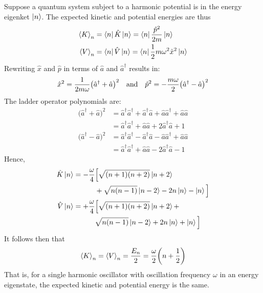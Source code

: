 \documentclass[nofootinbib,reprint,english]{revtex4-1}
\begin{document}
Suppose a quantum system subject to a harmonic potential is in the energy eigenket \(\ket{n}\). The expected kinetic and potential energies are thus
\begin{subequations}
\begin{align}
\expval{K}_n&=\bra{n}\hat{K}\ket{n}=\bra{n}\frac{\hat{p}^2}{2m}\ket{n}\\
\expval{V}_n&=\bra{n}\hat{V}\ket{n}=\bra{n}\frac{1}{2}m\omega^2\hat{x}^2\ket{n}
\end{align}
\end{subequations}
Rewriting \(\hat{x}\) and \(\hat{p}\) in terms of \(\hat{a}\) and \(\hat{a}^\dagger\) results in:
\begin{align*}
\hat{x}^2=\frac{1}{2m\omega}\big(\hat{a}^\dagger+\hat{a}\big)^2\qand\hat{p}^2=-\frac{m\omega}{2}\big(\hat{a}^\dagger-\hat{a}\big)^2
\end{align*}
The ladder operator polynomials are:
\begin{align*}
\big(\hat{a}^\dagger+\hat{a}\big)^2&=\hat{a}^\dagger\hat{a}^\dagger+\hat{a}^\dagger\hat{a}+\hat{a}\hat{a}^\dagger+\hat{a}\hat{a}\\
&=\hat{a}^\dagger\hat{a}^\dagger+\hat{a}\hat{a}+2\hat{a}^\dagger\hat{a}+1\\[0.25cm]
\big(\hat{a}^\dagger-\hat{a}\big)^2&=\hat{a}^\dagger\hat{a}^\dagger-\hat{a}^\dagger\hat{a}-\hat{a}\hat{a}^\dagger+\hat{a}\hat{a}\\
&=\hat{a}^\dagger\hat{a}^\dagger+\hat{a}\hat{a}-2\hat{a}^\dagger\hat{a}-1
\end{align*}
Hence,
\begin{subequations}\label{eq:harmonic_oscillator_kinetic_and_potential_action}
\begin{align}
\hat{K}\ket{n}&=-\frac{\omega}{4}\Big[\sqrt{(n+1)(n+2)}\ket{n+2}\nonumber\\
&\qquad\quad+\sqrt{n(n-1)}\ket{n-2}-2n\ket{n}-\ket{n}\Big]\\
\hat{V}\ket{n}&=+\frac{\omega}{4}\Big[\sqrt{(n+1)(n+2)}\ket{n+2}+\nonumber\\
&\qquad\quad\sqrt{n(n-1)}\ket{n-2}+2n\ket{n}+\ket{n}\Big]
\end{align}
\end{subequations}
It follows then that
\begin{equation}
\expval{K}_n=\expval{V}_n=\frac{E_n}{2}=\frac{\omega}{2}\bigg(n+\frac{1}{2}\bigg)
\end{equation}
That is, for a single harmonic oscillator with oscillation frequency \(\omega\) in an energy eigenstate, the expected kinetic and potential energy is the same.
\end{document}
